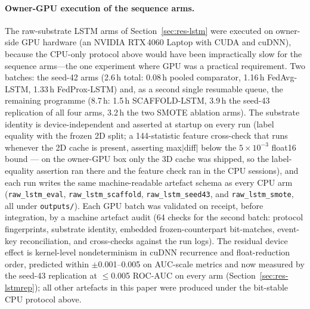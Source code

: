 \paragraph{Owner-GPU execution of the sequence arms.}
The raw-substrate LSTM arms of Section~\ref{sec:res-lstm} were
executed on owner-side GPU hardware (an NVIDIA RTX\,4060 Laptop
with CUDA and cuDNN), because the CPU-only protocol above would
have been impractically slow for the sequence arms---the one
experiment where GPU was a practical requirement. Two batches: the seed-42 arms (2.6\,h total: 0.08\,h
pooled comparator, 1.16\,h FedAvg-LSTM, 1.33\,h FedProx-LSTM) and,
as a second single resumable queue, the remaining programme (8.7\,h:
1.5\,h SCAFFOLD-LSTM, 3.9\,h the seed-43 replication of all four
arms, 3.2\,h the two SMOTE ablation arms). The substrate identity
is device-independent and asserted at startup on every run (label
equality with the frozen 2D split; a 144-statistic feature
cross-check that runs whenever the 2D cache is present, asserting
max$|$diff$|$ below the $5\times10^{-3}$ float16 bound --- on the
owner-GPU box only the 3D cache was shipped, so the label-equality
assertion ran there and the feature check ran in the CPU sessions),
and each run writes the same machine-readable
artefact schema as every CPU arm (\texttt{raw\_lstm\_eval},
\texttt{raw\_lstm\_scaffold}, \texttt{raw\_lstm\_seed43}, and
\texttt{raw\_lstm\_smote}, all under \texttt{outputs/}).
Each GPU batch was validated on receipt, before integration, by a
machine artefact audit (64 checks for the second batch: protocol
fingerprints, substrate identity, embedded frozen-counterpart
bit-matches, event-key reconciliation, and cross-checks against
the run logs). The residual device effect is kernel-level
nondeterminism in cuDNN recurrence and float-reduction order,
predicted within $\pm$0.001--0.005 on AUC-scale metrics and now
measured by the seed-43 replication at $\le$0.005 ROC-AUC on every
arm (Section~\ref{sec:res-lstmrep}); all other artefacts in this
paper were produced under the bit-stable CPU protocol above.

